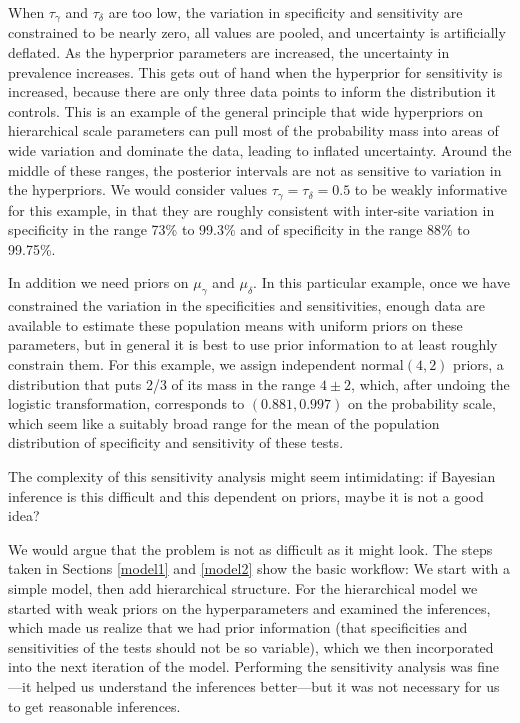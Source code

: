 \documentclass[11pt]{article}
\begin{document}
When $\tau_{\gamma}$ and $\tau_{\delta}$ are too low, the variation in
specificity and sensitivity are constrained to be nearly zero, all
values are pooled, and uncertainty is artificially deflated. As the
hyperprior parameters are increased, the uncertainty in prevalence
increases. This gets out of hand when the hyperprior for sensitivity
is increased, because there are only three data points to inform the
distribution it controls. This is an example of the general principle
that wide hyperpriors on hierarchical scale parameters can pull most
of the probability mass into areas of wide variation and dominate the
data, leading to inflated uncertainty.  Around the middle of these
ranges, the posterior intervals are not as sensitive to variation in
the hyperpriors. We would consider values
$\tau_{\gamma}=\tau_{\delta}=0.5$ to be weakly informative for this
example, in that they are roughly consistent with inter-site variation
in specificity in the range 73\% to 99.3\% and of specificity in the
range 88\% to 99.75\%.

In addition we need priors on $\mu_{\gamma}$ and $\mu_{\delta}$.  In
this particular example, once we have constrained the variation in the
specificities and sensitivities, enough data are available to estimate
these population means with uniform priors on these parameters, but in
general it is best to use prior information to at least roughly
constrain them.  For this example, we assign independent
$\mbox{normal}(4,2)$ priors, a distribution that puts 2/3 of its mass
in the range $4\pm 2$, which, after undoing the logistic
transformation, corresponds to $(0.881, 0.997)$ on the probability
scale, which seem like a suitably broad range for the mean of the
population distribution of specificity and sensitivity of these tests.

The complexity of this sensitivity analysis might seem intimidating:
if Bayesian inference is this difficult and this dependent on priors,
maybe it is not a good idea?

We would argue that the problem is not as difficult as it might look.
The steps taken in Sections \ref{model1} and \ref{model2} show the
basic workflow: We start with a simple model, then add hierarchical
structure.  For the hierarchical model we started with weak priors on
the hyperparameters and examined the inferences, which made us realize
that we had prior information (that specificities and sensitivities of
the tests should not be so variable), which we then incorporated into
the next iteration of the model.  Performing the sensitivity analysis
was fine---it helped us understand the inferences better---but it was
not necessary for us to get reasonable inferences.
\end{document}
